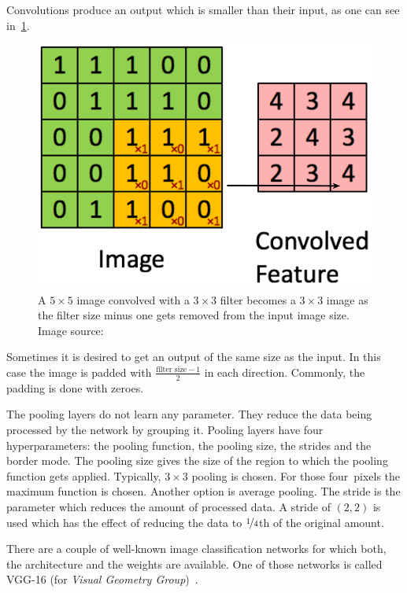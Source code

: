 Convolutions produce an output which is smaller than their input, as one can see
in~\cref{fig:convolution-size}.

\begin{figure}[ht]
    \centering
    \includegraphics[width=\linewidth]{images/convolution-schematic.png}
    \caption{A $5 \times 5$ image convolved with a $3 \times 3$ filter becomes
             a $3 \times 3$ image as the filter size minus one gets removed
             from the input image size.\\
             Image source:~\cite{Cyfoo}}
    \label{fig:convolution-size}
\end{figure}

Sometimes it is desired to get an output of the same size as the input. In this
case the image is padded with $\frac{\text{filter size} - 1}{2}$ in each
direction. Commonly, the padding is done with zeroes.

The pooling layers do not learn any parameter. They reduce the data being
processed by the network by grouping it. Pooling layers have four hyperparameters:
the pooling function, the pooling size, the strides and the border mode.
The pooling size gives the size of the region to which the pooling function
gets applied. Typically, $3 \times 3$ pooling is chosen. For those four~pixels
the maximum function is chosen. Another option is average pooling. The stride
is the parameter which reduces the amount of processed data. A stride of $(2, 2)$
is used which has the effect of reducing the data to $\nicefrac{1}{4}$th of
the original amount.

There are a couple of well-known image classification networks for which both,
the architecture and the weights are available. One of those networks is called
VGG-16 (for \textit{Visual Geometry Group})~\cite{KarenSimonyan,simonyan2014very}.


